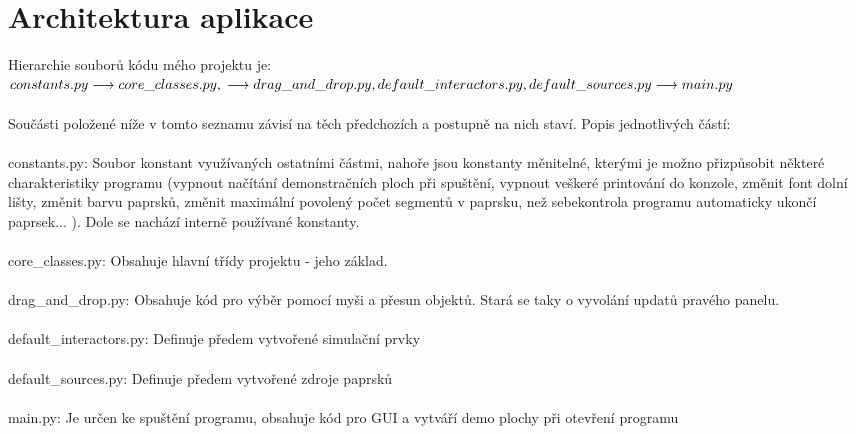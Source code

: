 \documentclass[12pt,a4paper]{report}
\begin{document}
\section{Architektura aplikace}
Hierarchie souborů kódu mého projektu je:
\newline $constants.py \newline \longrightarrow core\_classes.py, \newline \longrightarrow
drag\_and\_drop.py, default\_interactors.py, default\_sources.py \newline \longrightarrow main.py$
\paragraph{} Součásti položené níže v tomto seznamu závisí na těch předchozích a postupně na nich staví. Popis jednotlivých částí:
\paragraph{} constants.py: Soubor konstant využívaných ostatními částmi, nahoře jsou konstanty měnitelné, kterými je možno přizpůsobit některé charakteristiky programu (vypnout načítání demonstračních ploch při spuštění, vypnout veškeré printování do konzole, změnit font dolní lišty, změnit barvu paprsků, změnit maximální povolený počet segmentů v paprsku, než sebekontrola programu automaticky ukončí paprsek... ). Dole se nachází interně používané konstanty.
\paragraph{} core\_classes.py: Obsahuje hlavní třídy projektu - jeho základ.
\paragraph{} drag\_and\_drop.py: Obsahuje kód pro výběr pomocí myši a přesun objektů. Stará se taky o vyvolání updatů pravého panelu.
\paragraph{} default\_interactors.py: Definuje předem vytvořené simulační prvky
\paragraph{} default\_sources.py: Definuje předem vytvořené zdroje paprsků
\paragraph{} main.py: Je určen ke spuštění programu, obsahuje kód pro GUI a vytváří demo plochy při otevření programu
\end{document}
